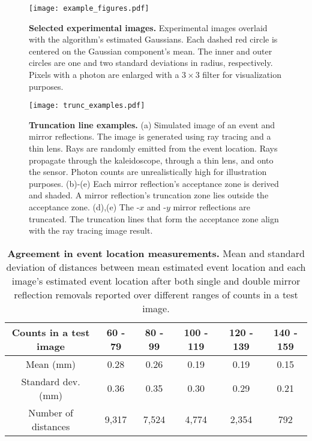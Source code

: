 \begin{figure*}
\centering
\texttt{[image: example\_figures.pdf]}
\caption{\textbf{Selected experimental images.} Experimental images overlaid with the algorithm's estimated Gaussians.
Each dashed red circle is centered on the Gaussian component's mean. 
The inner and outer circles are one and two standard deviations in radius, respectively.
Pixels with a photon are enlarged with a $3 \times 3$ filter for visualization purposes.
} 
\label{fig:example_figures}
\end{figure*}


\begin{figure}
\centering
\texttt{[image: trunc\_examples.pdf]}
\caption{\textbf{Truncation line examples.} (a) Simulated image of an event and mirror reflections. 
The image is generated using ray tracing and a thin lens. 
Rays are randomly emitted from the event location. 
Rays propagate through the kaleidoscope, through a thin lens, and onto the sensor.
Photon counts are unrealistically high for illustration purposes.
(b)-(e) Each mirror reflection's acceptance zone is derived and shaded. 
A mirror reflection's truncation zone lies outside the acceptance zone.
(d),(e) The -$x$ and -$y$ mirror reflections are truncated.
The truncation lines that form the acceptance zone align with the ray 
tracing image result.} 
\label{fig:trunc_examples}
\end{figure}



\begin{table}[h!]
\centering
\begin{tabular}{|c|ccccc|}
\hline
Counts in a test image & 60 - 79 & 80 - 99 & 100 - 119 & 120 - 139 & 140 - 159 \\
\hline
Mean (mm)                & 0.28 & 0.26 & 0.19 & 0.19 & 0.15 \\
Standard dev.  (mm)      & 0.36 & 0.35 & 0.30 & 0.29 & 0.21  \\
Number of distances    & 9,317  & 7,524  & 4,774  & 2,354  & 792 \\
\hline
\end{tabular}
\caption{\textbf{Agreement in event location measurements.} Mean and standard deviation of distances between mean estimated 
event location and each image's estimated event location after both single and 
double mirror reflection removals reported over different ranges of counts in a 
test image.}
\label{tab:crossval_thresh_error}
\end{table}

